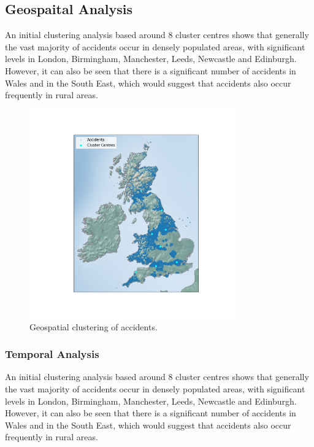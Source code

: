 \documentclass[12pt]{article}
\begin{document}
\subsection{Geospaital Analysis}

An initial clustering analysis based around 8 cluster centres shows that generally the vast majority of accidents occur in densely populated areas, with significant levels in London, Birmingham, Manchester, Leeds, Newcastle and Edinburgh. However, it can also be seen that there is a significant number of accidents in Wales and in the South East, which would suggest that accidents also occur frequently in rural areas.

\begin{figure}[h]
\centering     %
\includegraphics[width=0.80\textwidth]{accident_clusters}
\caption{Geospatial clustering of accidents.}
\end{figure}

\subsubsection{Temporal Analysis}

An initial clustering analysis based around 8 cluster centres shows that generally the vast majority of accidents occur in densely populated areas, with significant levels in London, Birmingham, Manchester, Leeds, Newcastle and Edinburgh. However, it can also be seen that there is a significant number of accidents in Wales and in the South East, which would suggest that accidents also occur frequently in rural areas.
\end{document}
